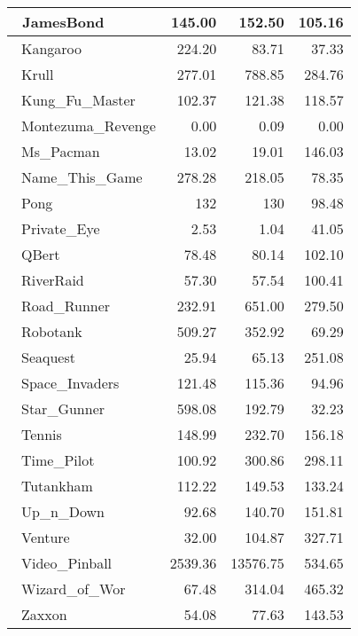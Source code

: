 \begin{table*}[h]
\begin{tabular}{l|r|r|r}
		\hline\
		JamesBond & 145.00 & 152.50 & 105.16 \\
		\hline\
		Kangaroo & 224.20 & 83.71 & 37.33 \\
		\hline\
		Krull & 277.01 & 788.85 & 284.76 \\
		\hline\
		Kung\_Fu\_Master & 102.37 & 121.38 & 118.57 \\
		\hline\
		Montezuma\_Revenge & 0.00 & 0.09 & 0.00 \\
		\hline\
		Ms\_Pacman & 13.02 & 19.01 & 146.03 \\
		\hline\
		Name\_This\_Game & 278.28 & 218.05 & 78.35 \\
		\hline\
		Pong & 132 & 130 & 98.48 \\
		\hline\
		Private\_Eye & 2.53 & 1.04 & 41.05 \\
		\hline\
		QBert & 78.48 & 80.14 & 102.10 \\
		\hline\
		RiverRaid & 57.30 & 57.54 & 100.41 \\
		\hline\
		Road\_Runner & 232.91 & 651.00 & 279.50 \\
		\hline\
		Robotank & 509.27 & 352.92 & 69.29 \\
		\hline\
		Seaquest & 25.94 & 65.13 & 251.08 \\
		\hline\
		Space\_Invaders & 121.48 & 115.36 & 94.96 \\
		\hline\
		Star\_Gunner & 598.08 & 192.79 & 32.23 \\
		\hline\
		Tennis & 148.99 & 232.70 & 156.18 \\
		\hline\
		Time\_Pilot & 100.92 & 300.86 & 298.11 \\
		\hline\
		Tutankham & 112.22 & 149.53 & 133.24 \\
		\hline\
		Up\_n\_Down & 92.68 & 140.70 & 151.81 \\
		\hline\
		Venture & 32.00 & 104.87 & 327.71 \\
		\hline\
		Video\_Pinball & 2539.36 & 13576.75 & 534.65 \\
		\hline\
		Wizard\_of\_Wor & 67.48 & 314.04 & 465.32 \\
		\hline\
		Zaxxon & 54.08 & 77.63 & 143.53 \\
		\hline
	\end{tabular}
\end{table*}

